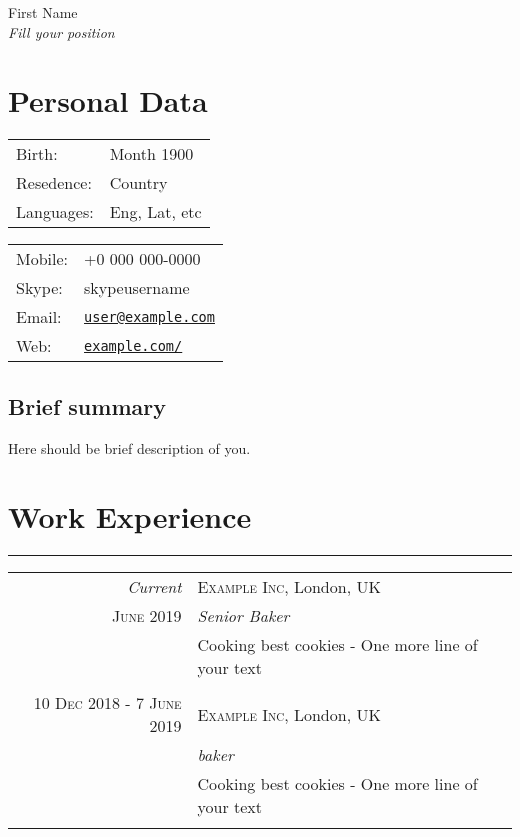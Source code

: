 \documentclass[a4paper,10pt]{article}
\def\name{First Name}
\begin{document}
{\huge \name \\}
\textit{Fill your position}

\section*{Personal Data}
\begin{minipage}{0.45\linewidth}
    \begin{tabular}{ll}
        Birth: &  Month 1900\\
        Resedence: &  Country \\
        Languages: & Eng, Lat, etc \\
      \end{tabular}
\end{minipage}
\begin{minipage}{0.45\linewidth}
    \begin{tabular}{ll}
      Mobile: & +0 000 000-0000 \\
      Skype: &  skypeusername \\
      Email: & \href{mailto:user@example.com}{\tt user@example.com} \\
      Web: & \href{https://www.example.com}{\tt example.com/} \\
    \end{tabular}
\end{minipage}
\subsection*{Brief summary}
\textnormal{Here should be brief description of you.}

\section*{Work Experience}
\vspace{-0.5ex}%
\rule{\textwidth}{0.3pt}
\vspace{-0.5ex}%
\begin{tabular}{r|p{11cm}}
  \emph{Current} & \textsc{Example Inc}, London, UK \\
\textsc{June 2019} & \emph{Senior Baker}\\ 
& \footnotesize{\textnormal{Cooking best cookies\newline
- One more line of your text}}\\
\multicolumn{2}{c}{} \\
\textsc{10 Dec 2018 - 7 June 2019} & \textsc{Example Inc}, London, UK \\
                                   & \emph{baker}\\
& \footnotesize{\textnormal{Cooking best cookies\newline
- One more line of your text}}\\
\multicolumn{2}{c}{} \\
\end{tabular}
\end{document}
